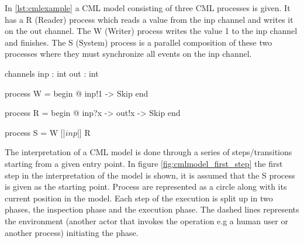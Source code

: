 \documentclass[a4paper, 10pt]{include/compassreport}   %
\begin{document}
In \autoref{lst:cmlexample} a CML model consisting of three CML
processes is given. It has a R (Reader) process which reads a value from
the inp channel and writes it on the out channel. The W (Writer)
process writes the value 1 to the inp channel and finishes. The
S (System) process is a parallel composition of these two processes where
they must synchronize all events on the inp channel.

\begin{cml}[caption=A process S composed of a parallel composition of a reader and writer process,tabsize=2, label={lst:cmlexample}]
channels
inp : int
out : int

process W = 
begin
 @ inp!1 -> Skip 
end

process R = 
begin
 @ inp?x -> out!x -> Skip 
end

process S = W [|{$inp$}|] R
\end{cml}

The interpretation of a CML model is done through a series of
steps/transitions starting from a given entry point. In figure
\ref{fig:cmlmodel_first_step} the first step in the interpretation of
the model is shown, it is assumed that the S process is given as the
starting point. Process are represented as a circle along with its
current position in the model. Each step of the execution is split up
in two phases, the inspection phase and the execution phase. The
dashed lines represents the environment (another actor that invokes
the operation e.g a human user or another process) initiating the phase.

 \begin{minipage}{1\linewidth} 
  \centering %
\label{fig:cmlmodel_first_step}
 \end{minipage} 
\end{document}
